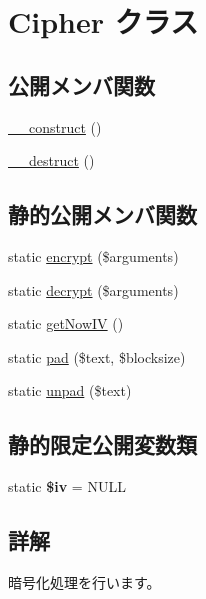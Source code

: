 \hypertarget{class_cipher}{}\section{Cipher クラス}
\label{class_cipher}
\subsection*{公開メンバ関数}
\begin{DoxyCompactItemize}
\item 
\hyperlink{class_cipher_a35e01f22996f07ab76a98e43901ce16d}{\+\_\+\+\_\+construct} ()
\item 
\hyperlink{class_cipher_a98a6560d7d2636194b0ba4a3335a2d41}{\+\_\+\+\_\+destruct} ()
\end{DoxyCompactItemize}
\subsection*{静的公開メンバ関数}
\begin{DoxyCompactItemize}
\item 
static \hyperlink{class_cipher_af83586f4fa8657c1c92b74a576cf454b}{encrypt} (\$arguments)
\item 
static \hyperlink{class_cipher_a0f4e2a0af5e67c1d66446301b367c4e1}{decrypt} (\$arguments)
\item 
static \hyperlink{class_cipher_adab7e1a9d0f7ef9ef956647383dfb8ab}{get\+Now\+I\+V} ()
\item 
static \hyperlink{class_cipher_a1985ff8212d2cda46bdf516e2e3e413f}{pad} (\$text, \$blocksize)
\item 
static \hyperlink{class_cipher_a1ddce1e31a41e331de65541c00436ac8}{unpad} (\$text)
\end{DoxyCompactItemize}
\subsection*{静的限定公開変数類}
\begin{DoxyCompactItemize}
\item 
\hypertarget{class_cipher_a8f76dc59d62626a82553636606ec3e98}{}static {\bfseries \$iv} = N\+U\+L\+L\label{class_cipher_a8f76dc59d62626a82553636606ec3e98}

\end{DoxyCompactItemize}


\subsection{詳解}
暗号化処理を行います。

